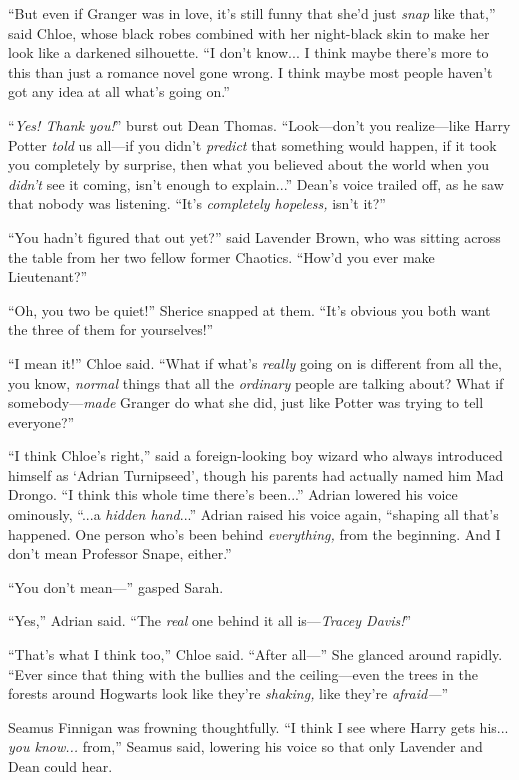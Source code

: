 “But even if Granger was in love, it’s still funny that she’d just \emph{snap} like that,” said Chloe, whose black robes combined with her night-black skin to make her look like a darkened silhouette. “I don’t know... I think maybe there’s more to this than just a romance novel gone wrong. I think maybe most people haven’t got any idea at all what’s going on.”

“\emph{Yes! Thank you!}” burst out Dean Thomas. “Look—don’t you realize—like Harry Potter \emph{told} us all—if you didn’t \emph{predict} that something would happen, if it took you completely by surprise, then what you believed about the world when you \emph{didn’t} see it coming, isn’t enough to explain...” Dean’s voice trailed off, as he saw that nobody was listening. “It’s \emph{completely hopeless,} isn’t it?”

“You hadn’t figured that out yet?” said Lavender Brown, who was sitting across the table from her two fellow former Chaotics. “How’d you ever make Lieutenant?”

“Oh, you two be quiet!” Sherice snapped at them. “It’s obvious you both want the three of them for yourselves!”

“I mean it!” Chloe said. “What if what’s \emph{really} going on is different from all the, you know, \emph{normal} things that all the \emph{ordinary} people are talking about? What if somebody—\emph{made} Granger do what she did, just like Potter was trying to tell everyone?”

“I think Chloe’s right,” said a foreign-looking boy wizard who always introduced himself as ‘Adrian Turnipseed’, though his parents had actually named him Mad Drongo. “I think this whole time there’s been...” Adrian lowered his voice ominously, “...a \emph{hidden hand}...” Adrian raised his voice again, “shaping all that’s happened. One person who’s been behind \emph{everything,} from the beginning. And I don’t mean Professor Snape, either.”

“You don’t mean—” gasped Sarah.

“Yes,” Adrian said. “The \emph{real} one behind it all is—\emph{Tracey Davis!}”

“That’s what I think too,” Chloe said. “After all—” She glanced around rapidly. “Ever since that thing with the bullies and the ceiling—even the trees in the forests around Hogwarts look like they’re \emph{shaking,} like they’re \emph{afraid—}”

Seamus Finnigan was frowning thoughtfully. “I think I see where Harry gets his... \emph{you know...} from,” Seamus said, lowering his voice so that only Lavender and Dean could hear.

